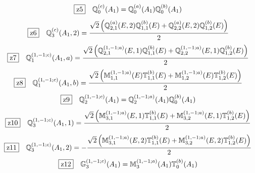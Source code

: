 \documentclass[fleqn,10pt,landscape]{jsarticle}
\begin{document}
\begin{dmath*}
\hspace*{3mm}\fbox{z5}\quad \mathbb{Q}_{0}^{(c)}(A_{1})=\mathbb{Q}_{0}^{(a)}(A_{1}) \mathbb{Q}_{0}^{(b)}(A_{1})
\end{dmath*}
\begin{dmath*}
\hspace*{3mm}\fbox{z6}\quad \mathbb{Q}_{3}^{(c)}(A_{1},2)=\frac{\sqrt{2} \left(\mathbb{Q}_{2,1}^{(a)}(E,2) \mathbb{Q}_{1,1}^{(b)}(E) + \mathbb{Q}_{2,2}^{(a)}(E,2) \mathbb{Q}_{1,2}^{(b)}(E)\right)}{2}
\end{dmath*}
\begin{dmath*}
\hspace*{3mm}\fbox{z7}\quad \mathbb{Q}_{1}^{(1,-1;c)}(A_{1},a)=\frac{\sqrt{2} \left(\mathbb{Q}_{2,1}^{(1,-1;a)}(E,1) \mathbb{Q}_{1,1}^{(b)}(E) + \mathbb{Q}_{2,2}^{(1,-1;a)}(E,1) \mathbb{Q}_{1,2}^{(b)}(E)\right)}{2}
\end{dmath*}
\begin{dmath*}
\hspace*{3mm}\fbox{z8}\quad \mathbb{Q}_{1}^{(1,-1;c)}(A_{1},b)=\frac{\sqrt{2} \left(\mathbb{M}_{1,1}^{(1,-1;a)}(E) \mathbb{T}_{1,1}^{(b)}(E) + \mathbb{M}_{1,2}^{(1,-1;a)}(E) \mathbb{T}_{1,2}^{(b)}(E)\right)}{2}
\end{dmath*}
\begin{dmath*}
\hspace*{3mm}\fbox{z9}\quad \mathbb{Q}_{2}^{(1,-1;c)}(A_{1})=\mathbb{Q}_{2}^{(1,-1;a)}(A_{1}) \mathbb{Q}_{0}^{(b)}(A_{1})
\end{dmath*}
\begin{dmath*}
\hspace*{3mm}\fbox{z10}\quad \mathbb{Q}_{3}^{(1,-1;c)}(A_{1},1)=\frac{\sqrt{2} \left(\mathbb{M}_{3,1}^{(1,-1;a)}(E,1) \mathbb{T}_{1,1}^{(b)}(E) + \mathbb{M}_{3,2}^{(1,-1;a)}(E,1) \mathbb{T}_{1,2}^{(b)}(E)\right)}{2}
\end{dmath*}
\begin{dmath*}
\hspace*{3mm}\fbox{z11}\quad \mathbb{Q}_{3}^{(1,-1;c)}(A_{1},2)=- \frac{\sqrt{2} \left(\mathbb{M}_{3,1}^{(1,-1;a)}(E,2) \mathbb{T}_{1,1}^{(b)}(E) + \mathbb{M}_{3,2}^{(1,-1;a)}(E,2) \mathbb{T}_{1,2}^{(b)}(E)\right)}{2}
\end{dmath*}
\begin{dmath*}
\hspace*{3mm}\fbox{z12}\quad \mathbb{G}_{3}^{(1,-1;c)}(A_{1})=\mathbb{M}_{3}^{(1,-1;a)}(A_{1}) \mathbb{T}_{0}^{(b)}(A_{1})
\end{dmath*}
\end{document}
